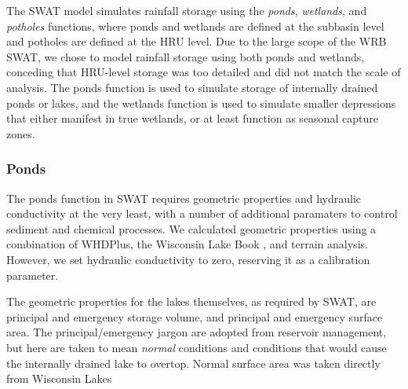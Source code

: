 The SWAT model simulates rainfall storage using the \textit{ponds}, \textit{wetlands}, and \textit{potholes} functions, where ponds and wetlands are defined at the subbasin level and potholes are defined at the HRU level. Due to the large scope of the WRB SWAT, we chose to model rainfall storage using both ponds and wetlands, conceding that HRU-level storage was too detailed and did not match the scale of analysis. The ponds function is used to simulate storage of internally drained ponds or lakes, and the wetlands function is used to simulate smaller depressions that either manifest in true wetlands, or at least function as seasonal capture zones.

\subsubsection{Ponds}\label{sec:ponds}

The ponds function in SWAT requires geometric properties and hydraulic conductivity at the very least, with a number of additional paramaters to control sediment and chemical processes. We calculated geometric properties using a combination of WHDPlus, the Wisconsin Lake Book \citep{wisconsin_wisconsin_lakes_2009}, and terrain analysis. However, we set hydraulic conductivity to zero, reserving it as a calibration parameter.

The geometric properties for the lakes themselves, as required by SWAT, are principal and emergency storage volume, and principal and emergency surface area. The principal/emergency jargon are adopted from reservoir management, but here are taken to mean \textit{normal} conditions and conditions that would cause the internally drained lake to overtop. Normal surface area was taken directly from Wisconsin Lakes \cite{wisconsin_wisconsin_lakes_2009} 